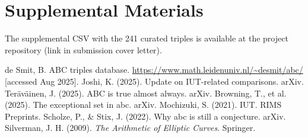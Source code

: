 \documentclass[11pt,a4paper]{article}
\begin{document}
\appendix
\section{Supplemental Materials}
The supplemental CSV with the 241 curated triples is available at the project repository (link in submission cover letter).
\begin{thebibliography}{9}
 de Smit, B. ABC triples database. \url{https://www.math.leidenuniv.nl/~desmit/abc/} [accessed Aug 2025].
 Joshi, K. (2025). Update on IUT-related comparisons. arXiv.
 Teräväinen, J. (2025). ABC is true almost always. arXiv.
 Browning, T., et al. (2025). The exceptional set in abc. arXiv.
 Mochizuki, S. (2021). IUT. RIMS Preprints.
 Scholze, P., \& Stix, J. (2022). Why abc is still a conjecture. arXiv.
 Silverman, J. H. (2009). \textit{The Arithmetic of Elliptic Curves}. Springer.
\end{thebibliography}
\end{document}

